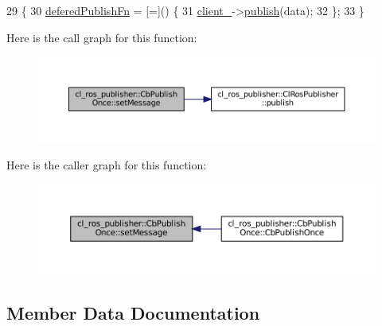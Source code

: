 \begin{DoxyCode}
29     \{
30         \hyperlink{classcl__ros__publisher_1_1CbPublishOnce_a6222a91fb87cd3118ca9f84ff857c696}{deferedPublishFn} = [=]() \{
31             \hyperlink{classcl__ros__publisher_1_1CbPublishOnce_aabb127ac2192a295ce9d11c63f3c9595}{client\_}->\hyperlink{classcl__ros__publisher_1_1ClRosPublisher_a3517d62fb0703a0a72efe6de7ad1a6d8}{publish}(data);
32         \};
33     \}
\end{DoxyCode}
Here is the call graph for this function\+:
\nopagebreak
\begin{figure}[H]
\begin{center}
\leavevmode
\includegraphics[width=350pt]{classcl__ros__publisher_1_1CbPublishOnce_aedf3cb7940951d76773f46c807f34a58_cgraph}
\end{center}
\end{figure}
Here is the caller graph for this function\+:
\nopagebreak
\begin{figure}[H]
\begin{center}
\leavevmode
\includegraphics[width=350pt]{classcl__ros__publisher_1_1CbPublishOnce_aedf3cb7940951d76773f46c807f34a58_icgraph}
\end{center}
\end{figure}


\subsection{Member Data Documentation}
\mbox{\label{classcl__ros__publisher_1_1CbPublishOnce_aabb127ac2192a295ce9d11c63f3c9595}} 
